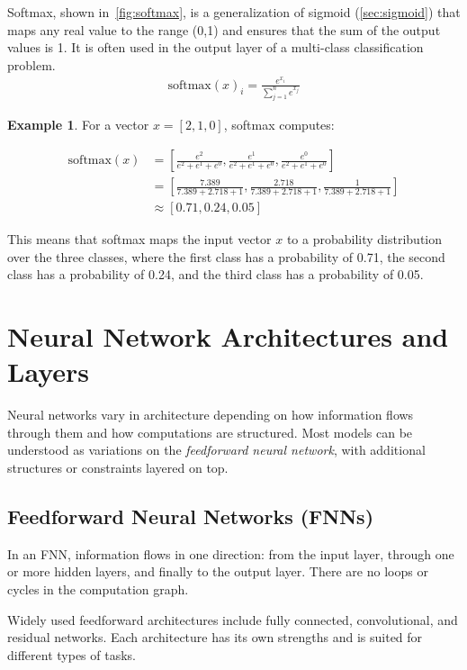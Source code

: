 \documentclass[oneside,11pt,dvipsnames]{book}
\numberwithin{equation}{section}
\theoremstyle{definition}
\newtheorem{example}{Example}[section]
\theoremstyle{remark}
\newcommand{\softmax}[1]{\mathrm{softmax}\left(#1\right)}
\begin{document}
Softmax, shown in~\autoref{fig:softmax}, is a generalization of sigmoid (\autoref{sec:sigmoid}) that maps any real value to the range (0,1) and ensures that the sum of the output values is 1. It is often used in the output layer of a multi-class classification problem.
\begin{align}
\softmax{x}_i = \frac{e^{x_i}}{\sum_{j=1}^{n}e^{x_j}}
\end{align}

\begin{example}
For a vector $x = [2, 1, 0]$, softmax computes: 

{\small
\begin{align*}
\softmax{x} &= \left[\frac{e^2}{e^2+e^1+e^0}, \frac{e^1}{e^2+e^1+e^0}, \frac{e^0}{e^2+e^1+e^0}\right] \\
&= \left[\frac{7.389}{7.389+2.718+1}, \frac{2.718}{7.389+2.718+1}, \frac{1}{7.389+2.718+1}\right] \\
&\approx [0.71, 0.24, 0.05]
\end{align*}
}

This means that softmax maps the input vector $x$ to a probability distribution over the three classes, where the first class has a probability of 0.71, the second class has a probability of 0.24, and the third class has a probability of 0.05.
\end{example}


\section{Neural Network Architectures and Layers}

Neural networks vary in architecture depending on how information flows through them and how computations are structured. Most models can be understood as variations on the \emph{feedforward neural network}, with additional structures or constraints layered on top. 





\subsection{Feedforward Neural Networks (FNNs)}\label{sec:ffn}

In an FNN, information flows in one direction: from the input layer, through one or more hidden layers, and finally to the output layer. There are no loops or cycles in the computation graph. 


Widely used feedforward architectures include fully connected, convolutional, and residual networks. Each architecture has its own strengths and is suited for different types of tasks.
\end{document}
